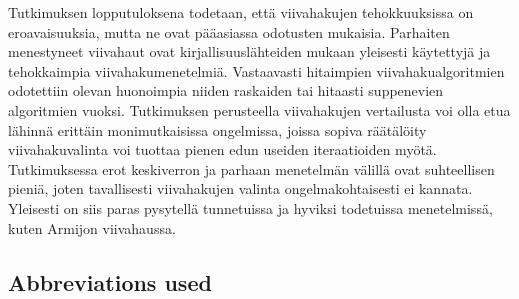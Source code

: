 \documentclass[english, 12pt, a4paper, sci, utf8, a-1b, online, table]{aaltothesis}
\begin{document}
\begin{abstractpage}[finnish]
Tutkimuksen lopputuloksena todetaan, että viivahakujen tehokkuuksissa on eroavaisuuksia, mutta ne ovat pääasiassa odotusten mukaisia. Parhaiten menestyneet viivahaut ovat kirjallisuuslähteiden mukaan yleisesti käytettyjä ja tehokkaimpia viivahakumenetelmiä. Vastaavasti hitaimpien viivahakualgoritmien odotettiin olevan huonoimpia niiden raskaiden tai hitaasti suppenevien algoritmien vuoksi. Tutkimuksen perusteella viivahakujen vertailusta voi olla etua lähinnä erittäin monimutkaisissa ongelmissa, joissa sopiva räätälöity viivahakuvalinta voi tuottaa pienen edun useiden iteraatioiden myötä. Tutkimuksessa erot keskiverron ja parhaan menetelmän välillä ovat suhteellisen pieniä, joten tavallisesti viivahakujen valinta ongelmakohtaisesti ei kannata. Yleisesti on siis paras pysytellä tunnetuissa ja hyviksi todetuissa menetelmissä, kuten Armijon viivahaussa.

\end{abstractpage}

\newpage

\thesistableofcontents

\subsection*{Abbreviations used}
\end{document}
